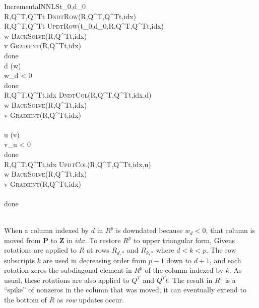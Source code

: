 \begin{pseudocode}{IncrementalNNLS}{t_0,d_0}
                              \\
R,Q^T,Q^Tt \GETS \textsc{DndtRow}(R,Q^T,Q^Tt,idx)           \\
R,Q^T,Q^Tt \GETS \textsc{UpdtRow}(t_0,d_0,R,Q^T,Q^Tt,idx)     \\
w \GETS \textsc{BackSolve}(R,Q^Tt,idx)                          \\
v \GETS \textsc{Gradient}(R,Q^Tt,idx)                    \\
\REPEAT
  done \GETS \TRUE                                              \\
  d \GETS \arg\min(w)                                          \\
  \IF w_d < 0 \THEN                                            \\
  \BEGIN
    done \GETS \FALSE                                         \\
    R,Q^T,Q^Tt,idx \GETS \textsc{DndtCol}(R,Q^T,Q^Tt,idx,d)   \\
    w \GETS \textsc{BackSolve}(R,Q^Tt,idx)                    \\
    v \GETS \textsc{Gradient}(R,Q^Tt,idx)              \\
  \END                                                        \\
  u \GETS \arg\min(v)                                         \\
  \IF v_u < 0 \THEN                                           \\
  \BEGIN
    done \GETS \FALSE                                         \\
    R,Q^T,Q^Tt,idx \GETS \textsc{UpdtCol}(R,Q^T,Q^Tt,idx,u)     \\
    w \GETS \textsc{BackSolve}(R,Q^Tt,idx)                    \\
    v \GETS \textsc{Gradient}(R,Q^Tt,idx)              \\
  \END                                                        \\
\UNTIL done                                                   \\
                                                  \\
\end{pseudocode}

When a column indexed by $d$ in $R^p$ is downdated because $w_d < 0$, that column is moved from \textbf{P} to \textbf{Z} in $idx$.
To restore $R^p$ to upper triangular form, Givens rotations are applied to $R$ at rows $R_{d,*}$ and $R_{k,*}$
where $d < k < p$. The row subscripts $k$ are used in decreasing order from $p-1$ down to $d+1$,
and each rotation zeros the subdiagonal element in $R^p$ of the column indexed by $k$.
As usual, these rotations are also applied to $Q^T$ and $Q^Tt$.
The result in $R^z$ is a ``spike'' of nonzeros in the column that was moved;
it can eventually extend to the bottom of $R$ as \emph{row} updates occur.

